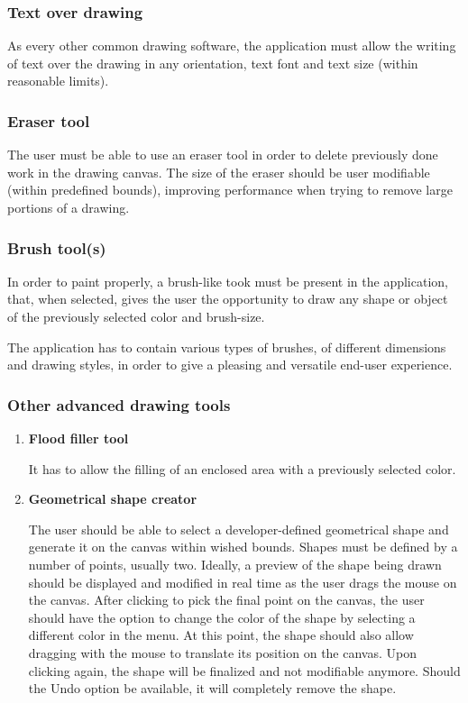 \documentclass[12pt]{article}
\begin{document}
\subsubsection{Text over drawing}
As every other common drawing software, the application must allow the writing of text over the drawing in any orientation, text font and text size (within reasonable limits).
\subsubsection{Eraser tool}
The user must be able to use an eraser tool in order to delete previously done work in the drawing canvas. The size of the eraser should be user modifiable (within predefined bounds), improving performance when trying to remove large portions of a drawing.
\subsubsection{Brush tool(s)}
In order to paint properly, a brush-like took must be present in the application, that, when selected, gives the user the opportunity to draw any shape or object of the previously selected color and brush-size.

The application has to contain various types of brushes, of different dimensions and drawing styles, in order to give a pleasing and versatile end-user experience.

\subsubsection{Other advanced drawing tools}
\begin{enumerate}

\item \textbf{Flood filler tool}

It has to allow the filling of an enclosed area with a previously selected color.

\item  \textbf{Geometrical shape creator}

The user should be able to select a developer-defined geometrical shape and generate it on the canvas within wished bounds. Shapes must be defined by a number of points, usually two. Ideally, a preview of the shape being drawn should be displayed and modified in real time as the user drags the mouse on the canvas. After clicking to pick the final point on the canvas, the user should have the option to change the color of the shape by selecting a different color in the menu. At this point, the shape should also allow dragging with the mouse to translate its position on the canvas. Upon clicking again, the shape will be finalized and not modifiable anymore. Should the Undo option be available, it will completely remove the shape.

\end{enumerate}
\end{document}
